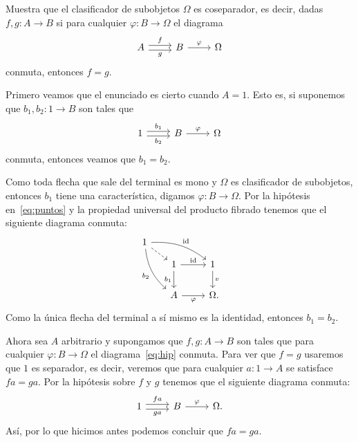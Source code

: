 \begin{exercise}[par=2, teca=2]
  Muestra que el clasificador de subobjetos \(\Omega\) es coseparador, es
  decir, dadas \(f,g\colon A\to B\) si para cualquier 
  \(\varphi\colon B\to\Omega\) el diagrama
  \begin{equation}\label{eq:hip}
    \begin{tikzcd}[ampersand replacement=\&]
      A\ar[shift left]{r}{f}\ar[shift right]{r}[swap]{g}\& B\ar{r}{\varphi}\& \Omega      
    \end{tikzcd}
  \end{equation}
  conmuta, entonces \(f = g\).
\end{exercise}
\begin{solution}
  Primero veamos que el enunciado es cierto cuando \(A=1\). Esto es, si
  suponemos que \(b_1,b_2\colon 1\to B\) son tales que
  \begin{equation}\label{eq:puntos}
    \begin{tikzcd}[ampersand replacement=\&]
      1\ar[shift left]{r}{b_1}\ar[shift right]{r}[swap]{b_2}\& B\ar{r}{\varphi}\& \Omega     
    \end{tikzcd}
  \end{equation}
  conmuta, entonces veamos que \(b_1 = b_2\).

  Como toda flecha que sale del terminal es mono y \(\Omega\) es clasificador de
  subobjetos, entonces \(b_1\) tiene una característica, digamos 
  \(\varphi\colon B\to\Omega\). Por la hipótesis en~\eqref{eq:puntos} y la propiedad
  universal del producto fibrado tenemos que el siguiente diagrama conmuta:
  \begin{equation*}
    \begin{tikzcd}[ampersand replacement=\&]
      1\ar[bend left=20]{rrd}{\id}\ar[bend right=20]{ddr}[swap]{b_2}
        \ar[dashed]{rd}\\[-2ex]
      \&[-2ex] 1\ar{r}{\id}\ar{d}[swap]{b_1} \& 1\ar{d}{v}\\
      \& A\ar{r}[swap]{\varphi} \& \Omega\mathrlap{.}
    \end{tikzcd}
  \end{equation*}
  Como la única flecha del terminal a sí mismo es la identidad, entonces
  \(b_1 = b_2\).

  Ahora sea \(A\) arbitrario y supongamos que \(f,g\colon A\to B\) son tales
  que para cualquier \(\varphi\colon B\to\Omega\) el diagrama~\eqref{eq:hip}
  conmuta. Para ver que \(f = g\) usaremos que \(1\) es separador, es decir,
  veremos que para cualquier \(a\colon 1\to A\) se satisface \(fa=ga\).
  Por la hipótesis sobre \(f\) y \(g\) tenemos que el siguiente diagrama
  conmuta:
  \begin{equation*}
    \begin{tikzcd}[ampersand replacement=\&]
      1\ar[shift left]{r}{fa}\ar[shift right]{r}[swap]{ga}\& B\ar{r}{\varphi}\& \Omega.    
    \end{tikzcd}
  \end{equation*}
  Así, por lo que hicimos antes podemos concluir que \(fa = ga\).
\end{solution}

